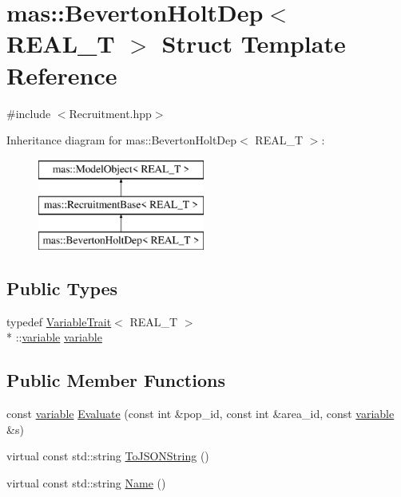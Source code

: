 \hypertarget{structmas_1_1_beverton_holt_dep}{\section{mas\-:\-:Beverton\-Holt\-Dep$<$ R\-E\-A\-L\-\_\-\-T $>$ Struct Template Reference}
\label{structmas_1_1_beverton_holt_dep}
}


{\ttfamily \#include $<$Recruitment.\-hpp$>$}

Inheritance diagram for mas\-:\-:Beverton\-Holt\-Dep$<$ R\-E\-A\-L\-\_\-\-T $>$\-:\begin{figure}[H]
\begin{center}
\leavevmode
\includegraphics[height=3.000000cm]{structmas_1_1_beverton_holt_dep}
\end{center}
\end{figure}
\subsection*{Public Types}
\begin{DoxyCompactItemize}
\item 
typedef \hyperlink{structmas_1_1_variable_trait}{Variable\-Trait}$<$ R\-E\-A\-L\-\_\-\-T $>$\\*
\-::\hyperlink{structmas_1_1_beverton_holt_dep_a9d24addbd81435aa63224f31f4b96fd3}{variable} \hyperlink{structmas_1_1_beverton_holt_dep_a9d24addbd81435aa63224f31f4b96fd3}{variable}
\end{DoxyCompactItemize}
\subsection*{Public Member Functions}
\begin{DoxyCompactItemize}
\item 
const \hyperlink{structmas_1_1_beverton_holt_dep_a9d24addbd81435aa63224f31f4b96fd3}{variable} \hyperlink{structmas_1_1_beverton_holt_dep_a9433b67c120c398d05c3f900db44f985}{Evaluate} (const int \&pop\-\_\-id, const int \&area\-\_\-id, const \hyperlink{structmas_1_1_beverton_holt_dep_a9d24addbd81435aa63224f31f4b96fd3}{variable} \&s)
\item 
virtual const std\-::string \hyperlink{structmas_1_1_beverton_holt_dep_ac2af0de80fd4cc3606d8986cfa1e5781}{To\-J\-S\-O\-N\-String} ()
\item 
virtual const std\-::string \hyperlink{structmas_1_1_beverton_holt_dep_ac389fdb4eb88ccd663ec47a854d703d1}{Name} ()
\end{DoxyCompactItemize}
